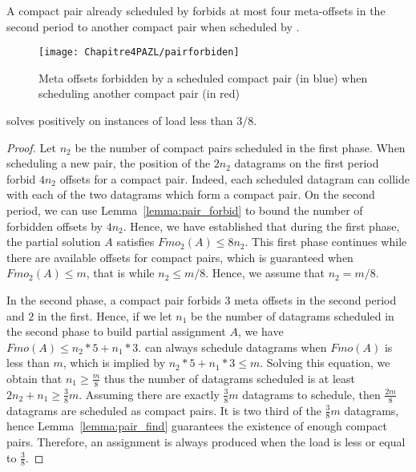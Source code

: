 \begin{lemma}\label{lemma:pair_forbid}
A compact pair already scheduled by \compactpair forbids at most four meta-offsets in the second period to another compact pair when scheduled by \compactpair.
\end{lemma}

\begin{figure}
\begin{center}
\texttt{[image: Chapitre4PAZL/pairforbiden]}
\end{center}

\caption{Meta offsets forbidden by a scheduled compact pair (in blue) when scheduling another compact pair (in red)} 
\label{fig:forbidenmeta}
\end{figure}
\begin{theorem}
\compactpair solves \pma positively on instances of load less than
$3/8$.
\end{theorem}
\begin{proof}
Let $n_2$ be the number of compact pairs scheduled in the first phase. When scheduling a new pair, the position of the $2n_2$ datagrams on the first period forbid $4n_2$ offsets for a compact pair. Indeed, each scheduled datagram can collide
with each of the two datagrams which form a compact pair. On the second period, we can use Lemma~\ref{lemma:pair_forbid} to bound the number of forbidden offsets by $4n_2$. 
Hence, we have established that during the first phase, the partial solution $A$
satisfies $Fmo_2(A) \leq 8n_2$. This first phase continues while there are available offsets for compact pairs, which is guaranteed when $Fmo_2(A) \leq m$, that is while $n_2 \leq m/8$. Hence, we assume that $n_2 = m/8$.

In the second phase, a compact pair forbids $3$ meta offsets in the 
second period and $2$ in the first. Hence, if we let $n_1$ be the number of datagrams scheduled in the second phase to build partial assignment $A$, we have $Fmo(A) \leq n_2*5 + n_1*3$. 
\compactpair can always schedule datagrams when $Fmo(A)$ is less than $m$, which is implied by $n_2*5 + n_1*3 \leq m$.
Solving this equation, we obtain that $n_1 \geq \frac{m}{8}$ thus the number of datagrams scheduled is at least $2n_2 + n_1 \geq \frac{3}{8}m$. Assuming there are exactly $\frac{3}{8}m$ datagrams to schedule, then $\frac{2m}{8}$ datagrams are scheduled as compact pairs. It is two third of the $\frac{3}{8}m$ datagrams, hence Lemma~\ref{lemma:pair_find} guarantees the existence of enough compact pairs. Therefore, an assignment is always produced when the load is less or equal to $\frac{3}{8}$.
\end{proof}

